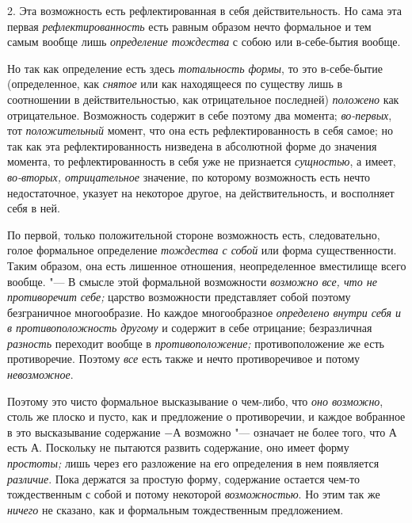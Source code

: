 2. Эта возможность есть рефлектированная в себя действительность. Но сама
эта первая {\em рефлектированность} есть равным образом
нечто формальное и тем самым вообще лишь
{\em определение тождества} с собою или в-себе-бытия вообще.

Но так как определение есть здесь {\em тотальность
формы}, то это в-себе-бытие (определенное, как
{\em снятое} или как находящееся по существу лишь в
соотношении в действительностью, как отрицательное последней)
{\em положено} как отрицательное. Возможность содержит
в себе поэтому два момента; {\em во-первых}, тот
{\em положительный} момент, что она есть
рефлектированность в себя самое; но так как эта рефлектированность
низведена в абсолютной форме до значения момента, то рефлектированность в
себя уже не признается {\em сущностью}, а имеет,
{\em во-вторых, отрицательное} значение, по которому возможность
есть нечто недостаточное, указует на некоторое другое, на действительность,
и восполняет себя в ней.

По первой, только положительной стороне возможность есть, следовательно,
голое формальное определение {\em тождества с собой}
или форма существенности. Таким образом, она есть лишенное отношения,
неопределенное вместилище всего вообще. "--- В смысле этой формальной
возможности {\em возможно все, что не противоречит
себе;} царство возможности представляет собой поэтому безграничное
многообразие. Но каждое многообразное {\em определено
внутри себя и в противоположность другому} и содержит в себе отрицание;
безразличная {\em разность} переходит вообще в
{\em противоположение;} противоположение же есть
противоречие. Поэтому {\em все} есть также и нечто
противоречивое и потому {\em невозможное}.

Поэтому это чисто формальное высказывание о чем-либо, что
{\em оно возможно}, столь же плоско и пусто, как и
предложение о противоречии, и каждое вобранное в это высказывание
содержание $-А$ возможно "--- означает не более того, что $А$
есть $А$. Поскольку не пытаются развить содержание, оно имеет форму
{\em простоты;} лишь через его разложение на его
определения в нем появляется {\em различие}. Пока
держатся за простую форму, содержание остается чем-то тождественным с собой
и потому некоторой {\em возможностью}. Но этим так же
{\em ничего} не сказано, как и формальным тождественным
предложением.

